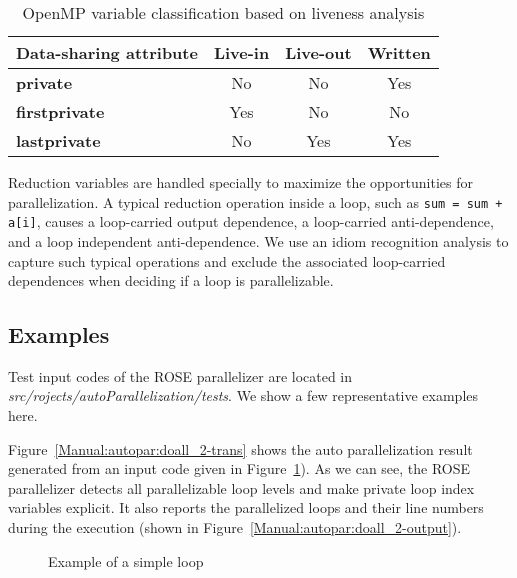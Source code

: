 \begin{table}[htbp]
\caption{OpenMP variable classification based on liveness analysis}
        \centering
\begin{tabular}{||l||c|c|c||} \hline
\textbf{Data-sharing attribute} & \textbf{Live-in} & \textbf{Live-out} &
\textbf{Written} \\ \hline
{\bfseries\scriptsize{private}} & No & No & Yes       \\ \hline
{\bfseries\scriptsize{firstprivate}} & Yes & No & No \\ \hline
{\bfseries\scriptsize{lastprivate}} & No & Yes  & Yes  \\ \hline
\end{tabular} 
\label{tab:varClassification}
\end{table}

Reduction variables are handled specially to maximize the opportunities for
parallelization.
A typical reduction operation inside a loop, such as
\lstinline{sum = sum + a[i]},
causes a loop-carried output
dependence, a loop-carried anti-dependence, and a loop independent anti-dependence.
We use an idiom recognition analysis to capture such typical operations and exclude
the associated loop-carried dependences when deciding if a loop is
parallelizable.
\subsection{Examples}
Test input codes of the ROSE parallelizer are located in \textit{src/rojects/autoParallelization/tests}.
We show a few representative examples here. 

Figure~\ref{Manual:autopar:doall_2-trans} shows the auto parallelization result generated from  an input code given in
Figure~\ref{Manual:autopar:doall_2}).
As we can see, the ROSE parallelizer detects all parallelizable loop levels and make private loop index variables explicit.
It also reports the parallelized loops and their line numbers during the execution (shown in Figure~\ref{Manual:autopar:doall_2-output}).

\lstset{language=C,basicstyle=\scriptsize,numbers=left}
\begin{figure}[htbp]
{\indent
  {\mySmallFontSize
    \begin{latexonly}
    
    \end{latexonly}
    \begin{htmlonly}
    
    \end{htmlonly}
  }
}
\caption{Example of a simple loop}
\label{Manual:autopar:doall_2}
\end{figure}

